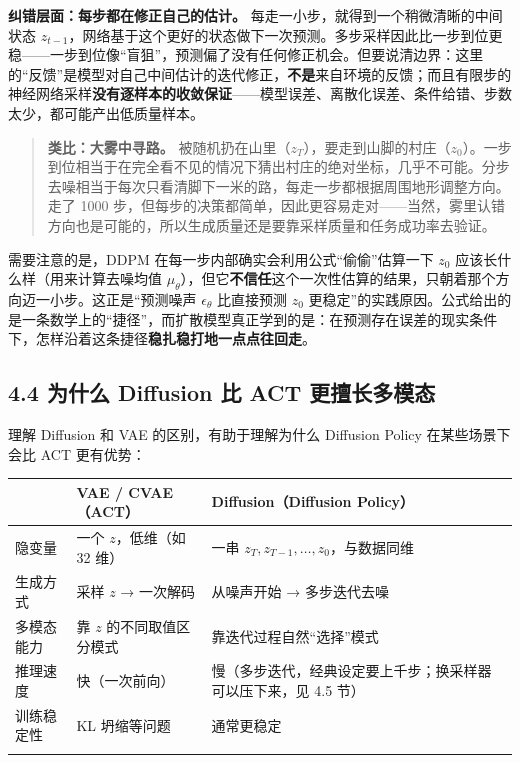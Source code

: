 \documentclass[
  chinese,
]{ctexart}
\begin{document}
\textbf{纠错层面：每步都在修正自己的估计。}
每走一小步，就得到一个稍微清晰的中间状态
\(z_{t-1}\)，网络基于这个更好的状态做下一次预测。多步采样因此比一步到位更稳------一步到位像``盲狙''，预测偏了没有任何修正机会。但要说清边界：这里的``反馈''是模型对自己中间估计的迭代修正，\textbf{不是}来自环境的反馈；而且有限步的神经网络采样\textbf{没有逐样本的收敛保证}------模型误差、离散化误差、条件给错、步数太少，都可能产出低质量样本。

\begin{quote}
\textbf{类比：大雾中寻路。}
被随机扔在山里（\(z_T\)），要走到山脚的村庄（\(z_0\)）。一步到位相当于在完全看不见的情况下猜出村庄的绝对坐标，几乎不可能。分步去噪相当于每次只看清脚下一米的路，每走一步都根据周围地形调整方向。走了
1000
步，但每步的决策都简单，因此更容易走对------当然，雾里认错方向也是可能的，所以生成质量还是要靠采样质量和任务成功率去验证。
\end{quote}

需要注意的是，DDPM 在每一步内部确实会利用公式``偷偷''估算一下 \(z_0\)
应该长什么样（用来计算去噪均值
\(\mu_\theta\)），但它\textbf{不信任}这个一次性估算的结果，只朝着那个方向迈一小步。这正是``预测噪声
\(\epsilon_\theta\) 比直接预测 \(z_0\)
更稳定''的实践原因。公式给出的是一条数学上的``捷径''，而扩散模型真正学到的是：在预测存在误差的现实条件下，怎样沿着这条捷径\textbf{稳扎稳打地一点点往回走}。

\subsection{4.4 为什么 Diffusion 比 ACT
更擅长多模态}\label{ux4e3aux4ec0ux4e48-diffusion-ux6bd4-act-ux66f4ux64c5ux957fux591aux6a21ux6001}

理解 Diffusion 和 VAE 的区别，有助于理解为什么 Diffusion Policy
在某些场景下会比 ACT 更有优势：

\begin{center}
\begin{tabular}{@{}>{\raggedright\arraybackslash}p{} >{\raggedright\arraybackslash}p{} >{\raggedright\arraybackslash}p{}@{}}
\toprule\noalign{}
 & VAE / CVAE（ACT） & Diffusion（Diffusion Policy） \\
\midrule\noalign{}
隐变量 & 一个 \(z\)，低维（如 32 维） & 一串 \(z_T, z_{T-1}, \ldots, z_0\)，与数据同维 \\
生成方式 & 采样 \(z\) → 一次解码 & 从噪声开始 → 多步迭代去噪 \\
多模态能力 & 靠 \(z\) 的不同取值区分模式 & 靠迭代过程自然``选择''模式 \\
推理速度 & 快（一次前向） & 慢（多步迭代，经典设定要上千步；换采样器可以压下来，见 4.5 节） \\
训练稳定性 & KL 坍缩等问题 & 通常更稳定 \\
\bottomrule\noalign{}
\end{tabular}
\end{center}
\end{document}
